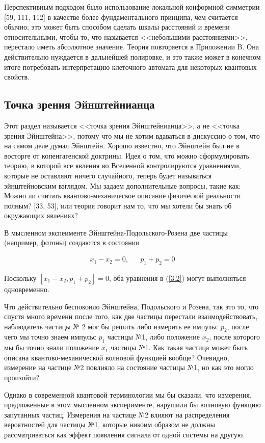 \documentclass[main.tex]{subfiles}
\begin{document}
Перспективным подходом было использование локальной конформной симметрии [59, 111, 112] в качестве более фундаментального принципа, чем считается обычно; это может быть способом сделать шкалы расстояний и времени относительными, чтобы то, что называется <<небольшими расстояниями>>, перестало иметь абсолютное значение. Теория повторяется в Приложении B. Она действительно нуждается в дальнейшей полировке, и это также может в конечном итоге потребовать интерпретацию клеточного автомата для некоторых квантовых свойств.

\subsection{Точка зрения Эйнштейнианца}\label{ch3.2}

    
Этот раздел называется <<точка зрения Эйнштейнианца>>, а не <<точка зрения Эйнштейна>>, потому что мы не хотим вдаваться в дискуссию о том, что на самом деле думал Эйнштейн. Хорошо известно, что Эйнштейн был не в восторге от копенгагенской доктрины. Идея о том, что можно сформулировать теорию, в которой все явления во Вселенной контролируются уравнениями, которые не оставляют ничего случайного, теперь будет называться эйнштейновским взглядом. Мы задаем дополнительные вопросы, такие как: Можно ли считать квантово-механическое описание физической реальности полным? [33, 53], или теория говорит нам то, что мы хотели бы знать об окружающих явлениях?

В мысленном экспеименте Эйнштейна-Подольского-Розена две частицы (например, фотоны) создаются в состоянии

\begin{align}\label{3.2}
	x_1 - x_2 = 0, &&
	p_1 + p_2 = 0
\end{align}

Поскольку $[x_1 - x_2, p_1 + p_2] = 0$, оба уравнения в (\ref{3.2}) могут выполняться одновременно.

Что действительно беспокоило Эйнштейна, Подольского и Розена, так это то, что спустя много времени после того, как две частицы перестали взаимодействовать, наблюдатель частицы № 2 мог бы решить либо измерить ее импульс $p_2$, после чего мы точно знаем импульс $p_1$ частицы №1, либо положение $x_2$, после которого мы бы точно знали положение $x_1$ частицы №1. Как такая частица может быть описана квантово-механической волновой функцией вообще? Очевидно, измерение на частице №2 повлияло на состояние частицы №1, но как это могло произойти?

Однако в современной квантовой терминологии мы бы сказали, что измерения, предложенные в этом мысленном эксперименте, нарушили бы волновую функцию запутанных частиц. Измерения на частице №2 влияют на распределения вероятностей для частицы №1, которые никоим образом не должны рассматриваться как эффект появления сигнала от одной системы на другую.
\end{document}
